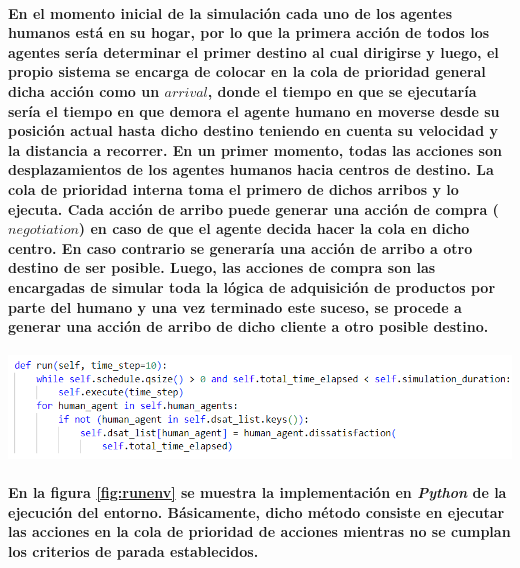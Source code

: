 \documentclass[12pt]{amsart}
\begin{document}
\paragraph{En el momento inicial de la simulación cada uno de los agentes humanos está en su hogar, por lo que la primera acción de todos los agentes sería determinar el primer destino al cual dirigirse y luego, el propio sistema se encarga de colocar en la cola de prioridad general dicha acción como un $arrival$, donde el tiempo en que se ejecutaría sería el tiempo en que demora el agente humano en moverse desde su posición actual hasta dicho destino teniendo en cuenta su velocidad y la distancia a recorrer. En un primer momento, todas las acciones son desplazamientos de los agentes humanos hacia centros de destino. La cola de prioridad interna toma el primero de dichos arribos y lo ejecuta. Cada acción de arribo puede generar una acción de compra ($negotiation$) en caso de que el agente decida hacer la cola en dicho centro. En caso contrario se generaría una acción de arribo a otro destino de ser posible. Luego, las acciones de compra son las encargadas de simular toda la lógica de adquisición de productos por parte del humano y una vez terminado este suceso, se procede a generar una acción de arribo de dicho cliente a otro posible destino.}

\begin{center}
	\includegraphics[scale=0.7]{./images/runenv.png}
	\label{fig:runenv}
\end{center}

\paragraph{En la figura \ref{fig:runenv} se muestra la implementación en \textit{Python} de la ejecución del entorno. Básicamente, dicho método consiste en ejecutar las acciones en la cola de prioridad de acciones mientras no se cumplan los criterios de parada establecidos.}
\end{document}
